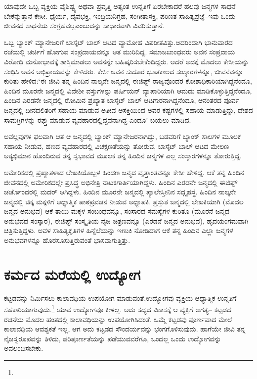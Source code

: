 ಯಾವುದೇ ಒಬ್ಬ ವ್ಯಕ್ತಿಯ ವೈಶಿಷ್ಟ್ಯ ಅಥವಾ ಪ್ರವೃತ್ತಿ ಅತ್ಯಂತ ಉನ್ನತಿಗೆ ಏರಬೇಕಾದರೆ ಹಲವು ಜನ್ಮಗಳ ಸಾಧನೆ ಬೇಕೆನ್ನುತ್ತಾನೆ ಕೇಸೀ. ಧೈರ್ಯ, ದೈವಭಕ್ತಿ, ಇಂದ್ರಿಯನಿಗ್ರಹ, ಸಂಗೀತಾಸಕ್ತಿ, ಪರಿಣತ ಸಾಹಿತ್ಯಪ್ರಜ್ಞೆ–ಇವು ಒಂದು ಜೀವನದ ಸಾಧನೆಯ ಸಂಗ್ರಹವಲ್ಲ\break ಎಂಬುದನ್ನು ಸಾಧಾರವಾಗಿ ವಿವರಿಸುತ್ತಾನೆ.

ಒಬ್ಬ ಬ್ಯಾಂಕ್ ಮ್ಯಾನೇಜರಿಗೆ ಬಾಸ್ಕೆಟ್ ಬಾಲ್ ಆಟದ ವ್ಯಾಮೋಹ ವಿಪರೀತವಿತ್ತು.\break ಅದರಿಂದಾಗಿ ಭಾನುವಾರದ ರಜೆಯಲ್ಲಿ ಚರ್ಚಿಗೆ ಹೋಗುವ ಸಂಪ್ರದಾಯವನ್ನೂ ಆತ ಮುರಿದಿದ್ದ. ಸಮಾಜಬಾಂಧವರು ಅವನ ಸಂಪ್ರದಾಯ ವಿರೋಧಿ ಮನೋಭಾವಕ್ಕೆ ಶಾಸ್ತಿಮಾಡಲು ಅವನನ್ನೇ ಬಹಿಷ್ಕರಿಸಬೇಕೆಂದಿದ್ದರು. ಆದರೆ ಅದಕ್ಕೆ ಮೊದಲು ಕೇಸೀಯನ್ನು ಸಂಧಿಸಿ ಅವನ ಅಭಿಪ್ರಾಯವನ್ನು ಕೇಳಿದರು. ಕೇಸೀ ಅವನ ಸುದೂರ ಭೂತಕಾಲದ ಸಂಸ್ಕಾರಗಳನ್ನೂ, ಜೀವನವನ್ನೂ ಕುರಿತು ಹೇಳಿದ:‘ಈ ಜೀವಿ ತನ್ನ ಹಿಂದಿನ ನಾಲ್ಕನೇ ಜನ್ಮದಲ್ಲಿ ಈಜಿಪ್ಟ್ ರಾಜ್ಯವೊಂದರ ಕೋಶಾಧಿಕಾರಿ\-ಯಾಗಿದ್ದನೆಂದೂ, ಹಿಂದಿನ ಮೂರನೇ ಜನ್ಮದಲ್ಲಿ ವಿದೇಶೀ ವಸ್ತುಗಳನ್ನು ಪರ್ಷಿಯನ್ ವ್ಯಾಪಾರಿಯಾಗಿ ಆಮದು ಮಾಡಿಕೊಳ್ಳುತ್ತಿದ್ದನೆಂದೂ, ಹಿಂದಿನ ಎರಡನೇ ಜನ್ಮದಲ್ಲಿ ರೋಮಿನ ಪ್ರಖ್ಯಾತ ಬಾಸ್ಕೆಟ್ ಬಾಲ್ ಆಟಗಾರನಾಗಿದ್ದನೆಂದೂ, ಆನಂತರದ ಪೂರ್ವ ಜನ್ಮದಲ್ಲಿ ದೀನದಲಿತರಿಗೆ ಸಹಾಯ ಮಾಡುವ ಅತೀವ ಆಸಕ್ತಿಯಿಂದ ಅವರ ಕಷ್ಟಗಳಲ್ಲಿ ಸಹಾಯ ಮಾಡುತ್ತಿದ್ದು, ದೇಶದ ಸಾಮಗ್ರಿಗಳನ್ನು ರಫ್ತು ಮಾಡುವ ವ್ಯವಹಾರದಲ್ಲಿದ್ದವನಾಗಿದ್ದ ಎಂದೂ’ ಬಯಲು ಮಾಡಿದ.

ಅವೆಲ್ಲವುಗಳ ಫಲವಾಗಿ ಆತ ಆ ಜನ್ಮದಲ್ಲಿ ಬ್ಯಾಂಕ್ ಮ್ಯಾನೇಜರನಾಗಿದ್ದು, ಬಡವರಿಗೆ ಬ್ಯಾಂಕ್ ಸಾಲಗಳ ಮೂಲಕ ಸಹಾಯ ನೀಡುವ, ಹಣದ ವ್ಯವಹಾರದಲ್ಲಿ ವಿಚಕ್ಷಣತೆಯನ್ನು ತೋರುವ, ಬಾಸ್ಕೆಟ್ ಬಾಲ್ ಆಟದ ಮೇಲಣ ಅತ್ಯಭಿಮಾನ ಹೊಂದಿರುವ ತನ್ನ ಸ್ವಭಾವದ ಮೂಲಕ ತನ್ನ ಹಿಂದಿನ ಜನ್ಮಗಳ ಎಲ್ಲ ಸಂಸ್ಕಾರಗಳನ್ನೂ ತೋರುತ್ತಿದ್ದ.

ಅಮೇರಿಕದಲ್ಲಿ ಪ್ರಖ್ಯಾತಳಾದ ಲೇಖಕಿಯೊಬ್ಬಳ ಹಿಂದಣ ಜನ್ಮದ ವೃತ್ತಾಂತವನ್ನೂ ಕೇಸೀ ಹೇಳಿದ್ದ. ಆಕೆ ತನ್ನ ಹಿಂದಿನ ಜೀವನದಲ್ಲಿ ಅಮೇರಿಕದಲ್ಲೇ ಪ್ರಸಿದ್ಧ ಅಭಿನೇತ್ರಿ ನಾಟಕಗಾರ್ತಿ\-ಯಾಗಿದ್ದಳು. ಹಿಂದಿನ ಎರಡನೇ ಜನ್ಮದಲ್ಲಿ ಈಜಿಪ್ಟ್ ಚರ್ಚೊಂದರಲ್ಲಿ ಮದರ್ ಆಗಿದ್ದಳು. ಹಿಂದಿನ ಮೂರನೇ ಜನ್ಮದಲ್ಲಿ ಪ್ಯಾಲೇಸ್ತೀನಿನ ಸದ್ಗೃಹಸ್ಥೆ. ಹಿಂದಿನ ನಾಲ್ಕನೇ ಜನ್ಮದಲ್ಲಿ ಚಿಕ್ಕ ಮಕ್ಕಳಿಗೆ ಆಧ್ಯಾತ್ಮಿಕ ಪಾಠಪ್ರವಚನ ನೀಡುವ ಅಧ್ಯಾಪಕಿ. ಪ್ರಸ್ತುತ ಜನ್ಮದಲ್ಲಿ ಲೇಖಕಿಯಾಗಿ (ಮೊದಲ ಜನ್ಮದ ಅನುಭವ) ಆಕೆ ತಾಯಿ ಮಕ್ಕಳ ಸಂಬಂಧವನ್ನೂ, ಸಂಸಾರದ ಸಮಸ್ಯೆಗಳ ಕುರಿತೂ (ಮೂರನೆ ಜನ್ಮದ ಅನುಭವದ ಸಂಸ್ಕಾರ), ಈಜಿಪ್ಟ್ ಸಂಸ್ಕೃತಿಯ ನೈಜ ಚಿತ್ರಣವನ್ನೂ (ಎರಡನೆ ಜನ್ಮದ ಅನುಭವ), ಹೃದಯಂಗಮವಾಗಿ ಚಿತ್ರಿಸುತ್ತಿದ್ದಳು. ಅವಳ ಸಾಹಿತ್ಯಕೃತಿಗಳ ಹಿನ್ನೆಲೆಯನ್ನು ಇಣುಕಿ ನೋಡಿದಾಗ ಆಕೆ ತನ್ನ ಹಿಂದಿನ ಎಲ್ಲಾ ಜನ್ಮಗಳ ಅನುಭವಗಳನ್ನೂ ಹೊರಸೂಸುತ್ತಿರುವಂತೆ ಭಾಸವಾಗುತ್ತಿತ್ತು.


\section*{ಕರ್ಮದ ಮರೆಯಲ್ಲಿ ಉದ್ಯೋಗ}


ಕಟ್ಟಡವನ್ನು ನಿರ್ಮಿಸಲು ಕಾಲಾವಧಿಯ  ಉಪಯೋಗ ಮಾಡುವಂತೆ,\break ಉದ್ಯೋಗವು ವ್ಯಕ್ತಿಯ ಆಧ್ಯಾತ್ಮಿಕ ಉನ್ನತಿಗೆ ಸಹಕಾರಿಯಾಗುವುದು.\footnote{} ಯಾವ ಉದ್ಯೋಗವೂ ಕೀಳಲ್ಲ. ಅದು ಸದ್ಯದ ವಿಕಾಸಕ್ಕೆ ಆ ವ್ಯಕ್ತಿಗೆ ಅಗತ್ಯ– ಕಟ್ಟಡದ ರಚನೆಯ ಮೊದಲ ಹಂತದಲ್ಲಿ ಕಾಲಾವಧಿಯನ್ನು ಉಪಯೋಗಿಸಿದಂತೆ. ಒಮ್ಮೆ ಕಟ್ಟಡವು ಪೂರ್ಣವಾದ ಮೇಲೆ ಕಾಲಾವಧಿಯ ಆವಶ್ಯಕತೆ ಇಲ್ಲ, ಆಗ ಅದು ಕಟ್ಟಡದ ಸೌಂದರ್ಯವನ್ನು ಭಂಗಗೊಳಿಸುವುದು. ಹಾಗೆಯೇ ಜೀವಿ ತನ್ನ ನೈಜಸ್ವರೂಪವನ್ನು ತಿಳಿದು, ಪರಿಪೂರ್ಣತೆಯನ್ನು ಪಡೆಯುವವರೆಗೂ, ಒಂದಲ್ಲ ಒಂದು ಉದ್ಯೋಗವನ್ನು ಅವಲಂಬಿಸಬೇಕು.

